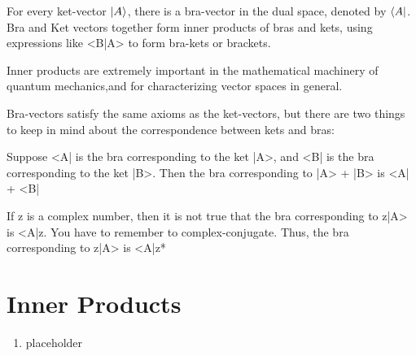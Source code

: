 \documentclass[12pt,a4paper,twocolumn]{article}
\begin{document}
For every ket-vector $\ket{A}$, there is a bra-vector in the dual space, denoted by $\bra{A}$. Bra and Ket vectors together form inner products of bras and kets, using expressions like <B|A> to form bra-kets or brackets.

Inner products are extremely important in the mathematical machinery of quantum mechanics,and for characterizing vector spaces in general.

Bra-vectors satisfy the same axioms as the ket-vectors, but there are two things to keep in mind about the correspondence between kets and bras:

    Suppose <A| is the bra corresponding to the ket |A>, and <B| is the bra corresponding to the ket |B>. Then the bra corresponding to |A> + |B> is <A| + <B|

    If z is a complex number, then it is not true that the bra corresponding to z|A> is <A|z. You have to remember to complex-conjugate. Thus, the bra corresponding to z|A> is <A|z*

\section{Inner Products}
\begin{enumerate}
\item placeholder
\end{enumerate}
\end{document}
